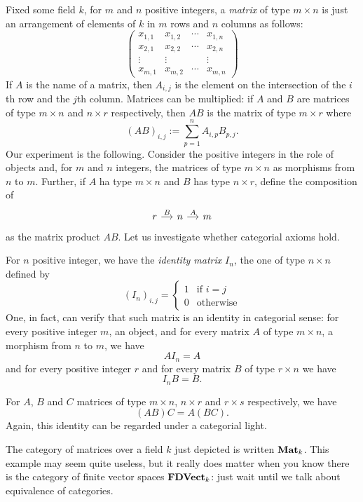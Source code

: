 \begin{example}[Matrices]\label{example:Mat}
  Fixed some field \(k\), for \(m\) and \(n\) positive integers, a {\em
    matrix} of type \(m \times n\) is just an arrangement of elements of
  \(k\) in \(m\) rows and \(n\) columns as follows:
  \[
    \begin{pmatrix}
      x_{1,1} & x_{1,2} & \cdots{} & x_{1,n} \\
      x_{2,1} & x_{2,2} & \cdots{} & x_{2,n} \\
      \vdots  & \vdots  &          & \vdots  \\
      x_{m,1} & x_{m,2} & \cdots{} & x_{m,n}
    \end{pmatrix}
  \]
  If \(A\) is the name of a matrix, then \(A_{i, j}\) is the element on
  the intersection of the \(i\)th row and the \(j\)th column. Matrices
  can be multiplied: if \(A\) and \(B\) are matrices of type
  \(m \times n\) and \(n \times r\) respectively, then \(AB\) is the matrix of
  type \(m \times r\) where
  \[
    (AB)_{i, j} := \sum_{p = 1}^n A_{i, p} B_{p ,j} .
  \]
  Our experiment is the following. Consider the positive integers in the
  role of objects and, for \(m\) and \(n\) integers, the matrices of
  type \(m \times n\) as morphisms from \(n\) to \(m\). Further, if
  \(A\) ha type \(m \times n\) and \(B\) has type \(n \times r\), define the
  composition of
  \[
    \begin{tikzcd}[column sep=small]
      r \ar["{B}", r] & n \ar["{A}", r] & m
    \end{tikzcd}
  \]
  as the matrix product \(AB\). Let us investigate whether categorial
  axioms hold.
  \begin{tcbitem}
  \item For \(n\) positive integer, we have the {\em identity matrix}
    \(I_n\), the one of type \(n \times n\) defined by
    \[
      (I_n)_{i, j} =
      \begin{cases}
        1 & \text{if } i = j \\
        0 & \text{otherwise}
      \end{cases}
    \]
    One, in fact, can verify that such matrix is an identity in
    categorial sense: for every positive integer \(m\), an object, and
    for every matrix \(A\) of type \(m \times n\), a morphism from \(n\) to
    \(m\), we have
    \[
      A I_n = A
    \]
    and for every positive integer \(r\) and for every matrix \(B\) of
    type \(r \times n\) we have
    \[
      I_n B = B .
    \]
  \item For \(A\), \(B\) and \(C\) matrices of type \(m \times n\),
    \(n \times r\) and \(r \times s\) respectively, we have
    \[
      (AB)C = A(BC) .
    \]
    Again, this identity can be regarded under a categorial light.
  \end{tcbitem}
  The category of matrices over a field \(k\) just depicted is written
  \(\mathbf{Mat}_k\). This example may seem quite useless, but it really does
  matter when you know there is the category of finite vector spaces
  \(\mathbf{FDVect}_k\): just wait until we talk about equivalence of
  categories.
\end{example}



